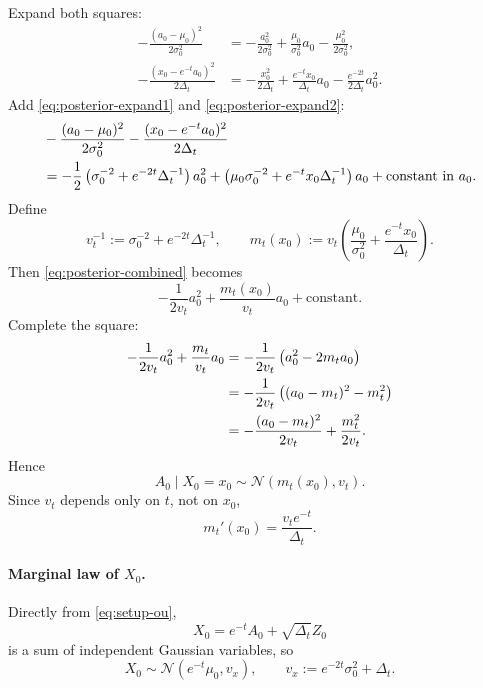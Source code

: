 \documentclass[11pt,a4paper]{article}
\newcommand{\Dt}{\Delta_t}
\begin{document}
Expand both squares:
\begin{align}
-\frac{(a_0-\mu_0)^2}{2\sigma_0^2}
&=
-\frac{a_0^2}{2\sigma_0^2}
+\frac{\mu_0}{\sigma_0^2} a_0
-\frac{\mu_0^2}{2\sigma_0^2},
\label{eq:posterior-expand1}\\[0.25em]
-\frac{(x_0-e^{-t}a_0)^2}{2\Dt}
&=
-\frac{x_0^2}{2\Dt}
+\frac{e^{-t} x_0}{\Dt} a_0
-\frac{e^{-2t}}{2\Dt} a_0^2.
\label{eq:posterior-expand2}
\end{align}
Add \eqref{eq:posterior-expand1} and \eqref{eq:posterior-expand2}:
\begin{align}
&-\frac{(a_0-\mu_0)^2}{2\sigma_0^2} - \frac{(x_0-e^{-t}a_0)^2}{2\Dt}
\notag\\
&=
-\frac12 \left(\sigma_0^{-2} + e^{-2t}\Dt^{-1}\right) a_0^2
+
\left(\mu_0\sigma_0^{-2} + e^{-t} x_0 \Dt^{-1}\right) a_0
+
\text{constant in } a_0.
\label{eq:posterior-combined}
\end{align}
Define
\begin{equation}
v_t^{-1} := \sigma_0^{-2} + e^{-2t}\Dt^{-1},
\qquad
m_t(x_0) := v_t\left(\frac{\mu_0}{\sigma_0^2} + \frac{e^{-t} x_0}{\Dt}\right).
\label{eq:vt-mt-def}
\end{equation}
Then \eqref{eq:posterior-combined} becomes
\[
-\frac{1}{2v_t} a_0^2 + \frac{m_t(x_0)}{v_t} a_0 + \text{constant}.
\]
Complete the square:
\begin{align}
-\frac{1}{2v_t} a_0^2 + \frac{m_t}{v_t} a_0
&=
-\frac{1}{2v_t} \left(a_0^2 - 2m_t a_0\right)
\notag\\
&=
-\frac{1}{2v_t} \left((a_0-m_t)^2 - m_t^2\right)
\notag\\
&=
-\frac{(a_0-m_t)^2}{2v_t} + \frac{m_t^2}{2v_t}.
\label{eq:posterior-square}
\end{align}
Hence
\begin{equation}
A_0 \mid X_0=x_0 \sim \mathcal N(m_t(x_0),v_t).
\label{eq:posterior-final}
\end{equation}
Since $v_t$ depends only on $t$, not on $x_0$,
\begin{equation}
m_t'(x_0) = \frac{v_t e^{-t}}{\Dt}.
\label{eq:mt-prime}
\end{equation}

\paragraph{Marginal law of $X_0$.}
Directly from \eqref{eq:setup-ou},
\[
X_0 = e^{-t} A_0 + \sqrt{\Dt} Z_0
\]
is a sum of independent Gaussian variables, so
\begin{equation}
X_0 \sim \mathcal N(e^{-t}\mu_0, v_x),
\qquad
v_x := e^{-2t} \sigma_0^2 + \Dt.
\label{eq:x0-marginal-final}
\end{equation}
\end{document}
